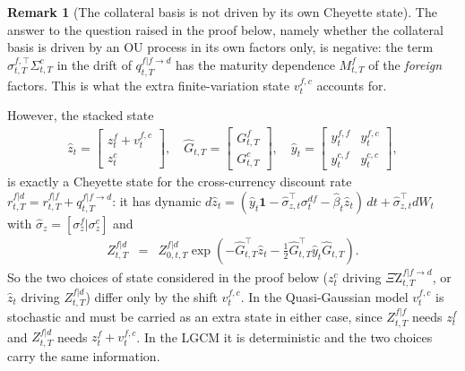 \documentclass[11pt,english]{amsart}
\newcommand{\vun}{\mathbf{1}}
\newcommand{\QZ}{{\Xi\mathrm{Z}}}
\theoremstyle{definition}
\newtheorem{rema}{Remark}
\begin{document}
\begin{rema}[The collateral basis is not driven by its own Cheyette state]\label{rema:qgcm_vfc}
The answer to the question raised in the proof below, namely whether the collateral basis is driven by an OU process in its own factors only, is negative: the term $\sigma^{f,\top}_{t,T}\Sigma^{c}_{t,T}$ in the drift of $q^{f|f\to d}_{t,T}$ has the maturity dependence $M^{f}_{t,T}$ of the \emph{foreign} factors. This is what the extra finite-variation state $v^{f,c}_t$ accounts for.

However, the stacked state
\begin{eqnarray}
  \hat{z}_t = \begin{bmatrix} z^f_t + v^{f,c}_t \\ z^c_t \end{bmatrix}, \quad
  \hat{G}_{t,T} = \begin{bmatrix} G^f_{t,T} \\ G^c_{t,T} \end{bmatrix}, \quad
  \hat{y}_t = \begin{bmatrix} y^{f,f}_t & y^{f,c}_t \\ y^{c,f}_t & y^{c,c}_t \end{bmatrix} ,
\end{eqnarray}
is exactly a Cheyette state for the cross-currency discount rate $r^{f|d}_{t,T} = r^{f|f}_{t,T} + q^{f|f\to d}_{t,T}$: it has dynamic $d\hat{z}_t = (\hat{y}_t\vun - \hat{\sigma}^\top_{z,t}\sigma^{df}_t - \hat{\beta}_t\hat{z}_t)\,dt + \hat{\sigma}^\top_{z,t} dW_t$ with $\hat{\sigma}_{z} = [\sigma^f_z | \sigma^c_z]$ and
\begin{eqnarray}
  Z^{f|d}_{t,T} &=& Z^{f|d}_{0,t,T} \exp\left( -\hat{G}^{\top}_{t,T} \hat{z}_t - \frac{1}{2} \hat{G}^{\top}_{t,T}  \hat{y}_t \hat{G}_{t,T} \right) .
  \label{eq:qgcm_zfd_reconstruction}
\end{eqnarray}
So the two choices of state considered in the proof below ($z^{c}_t$ driving $\QZ^{f|f\to d}_{t,T}$, or $\hat{z}_t$ driving $Z^{f|d}_{t,T}$) differ only by the shift $v^{f,c}_t$. In the Quasi-Gaussian model $v^{f,c}_t$ is stochastic and must be carried as an extra state in either case, since $Z^{f|f}_{t,T}$ needs $z^f_t$ and $Z^{f|d}_{t,T}$ needs $z^f_t + v^{f,c}_t$. In the LGCM it is deterministic and the two choices carry the same information.
\end{rema}
\end{document}
